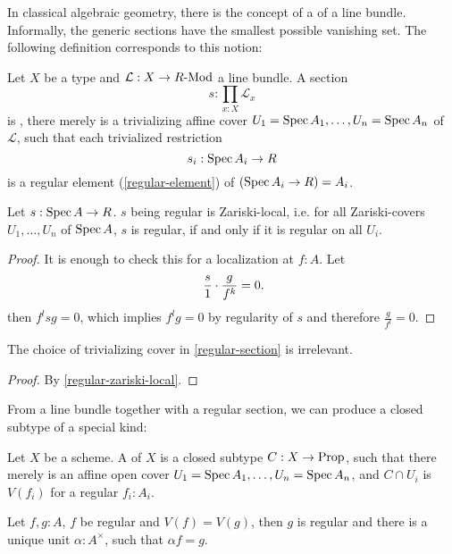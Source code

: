 In classical algebraic geometry,
there is the concept of a  of a line bundle.
Informally, the generic sections have the smallest possible vanishing set.
The following definition corresponds to this notion:

\begin{definition}%
  \label{regular-section}
  Let $X$ be a type and $\mathcal L:X\to R\text{-}\mathrm{Mod}$ a line bundle.
  A section
  \[ s:\prod_{x:X}\mathcal L_x \]
  is , there merely is a trivializing affine cover $U_1=\operatorname{Spec} A_1,\dots,U_n=\operatorname{Spec} A_n$
  of $\mathcal L$, such that each trivialized restriction
  \[ s_i:\operatorname{Spec} A_i\to R \]
  is a regular element (\cref{regular-element}) of $(\operatorname{Spec} A_i\to R) = A_i$.
\end{definition}

\begin{lemma}%
  \label{regular-zariski-local}
  Let $s:\operatorname{Spec} A\to R$.
  $s$ being regular is Zariski-local, i.e.
  for all Zariski-covers $U_1,\dots,U_n$ of $\operatorname{Spec} A$,
  $s$ is regular, if and only if it is regular on all $U_i$.
\end{lemma}

\begin{proof}
  It is enough to check this for a localization at $f:A$.
  Let
  \[ \frac{s}{1}\cdot\frac{g}{f^k}=0\rlap{.} \]
  then $f^lsg=0$, which implies $f^lg=0$ by regularity of $s$ and therefore $\frac{g}{f^l}=0$.
\end{proof}

\begin{proposition}%
  The choice of trivializing cover in \cref{regular-section}
  is irrelevant.
\end{proposition}

\begin{proof}
  By \cref{regular-zariski-local}.
\end{proof}

From a line bundle together with a regular section,
we can produce a closed subtype of a special kind:

\begin{definition}%
  Let $X$ be a scheme.
  A  of $X$ is a closed subtype
  $C:X\to \mathrm{Prop}$, such that there merely is an affine open cover $U_1=\operatorname{Spec} A_1,\dots,U_n=\operatorname{Spec} A_n$,
  and $C\cap U_i$ is $V(f_i)$ for a regular $f_i:A_i$.
\end{definition}

\begin{lemma}%
  Let $f,g:A$, $f$ be regular and $V(f)=V(g)$,
  then $g$ is regular and there is a unique unit $\alpha:A^\times$, such that $\alpha f=g$.
\end{lemma}

